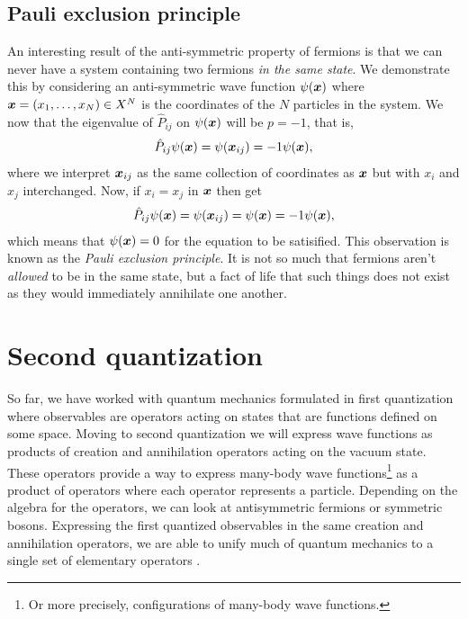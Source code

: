         \subsection{Pauli exclusion principle}
            An interesting result of the anti-symmetric property of fermions is
            that we can never have a system containing two fermions \emph{in the
            same state}.
            We demonstrate this by considering an anti-symmetric wave function
            $\psi(\boldsymbol{x})$ where $\boldsymbol{x} = (x_1, \dots, x_N) \in X^{N}$ is the
            coordinates of the $N$ particles in the system.
            We now that the eigenvalue of $\hat{P}_{ij}$ on $\psi(\boldsymbol{x})$ will
            be $p = -1$, that is,
            \begin{align}
                \hat{P}_{ij}\psi(\boldsymbol{x})
                = \psi(\boldsymbol{x}_{ij})
                = -1\psi(\boldsymbol{x}),
            \end{align}
            where we interpret $\boldsymbol{x}_{ij}$ as the same collection of
            coordinates as $\boldsymbol{x}$ but with $x_i$ and $x_j$ interchanged.
            Now, if $x_i = x_j$ in $\boldsymbol{x}$ then get
            \begin{gather}
                \hat{P}_{ij}\psi(\boldsymbol{x})
                = \psi(\boldsymbol{x}_{ij})
                = \psi(\boldsymbol{x})
                = -1\psi(\boldsymbol{x}),
            \end{gather}
            which means that $\psi(\boldsymbol{x}) = 0$ for the equation to be
            satisified.
            This observation is known as the \emph{Pauli exclusion
            principle}.
            It is not so much that fermions aren't \emph{allowed} to be in the
            same state, but a fact of life that such things does not exist as
            they would immediately annihilate one another.


    \section{Second quantization}
        So far, we have worked with quantum mechanics formulated in first
        quantization where observables are operators acting on states that are
        functions defined on some space.
        Moving to second quantization we will express wave functions as products
        of creation and annihilation operators acting on the vacuum state.
        These operators provide a way to express many-body wave
        functions\footnote{%
            Or more precisely, configurations of many-body wave functions.%
        } as a product of operators where each operator represents a particle.
        Depending on the algebra for the operators, we can look at antisymmetric
        fermions or symmetric bosons.
        Expressing the first quantized observables in the same creation and
        annihilation operators, we are able to unify much of quantum mechanics
        to a single set of elementary operators \cite{helgaker-molecular}.

